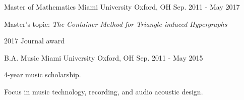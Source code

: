 

\begin{cventries}

  \cventry
    {Master of Mathematics} %
    {Miami University} %
    {Oxford, OH} %
    {Sep. 2011 - May 2017} %
    {
      \begin{cvitems} %
        \item {Master's topic: {\it The Container Method for Triangle-induced Hypergraphs}}
        \item {2017 Journal award}
      \end{cvitems}
    }

  \cventry
    {B.A. Music} %
    {Miami University} %
    {Oxford, OH} %
    {Sep. 2011 - May 2015} %
    {
      \begin{cvitems} %
        \item {4-year music scholarship.}
        \item {Focus in music technology, recording, and audio acoustic design.}
      \end{cvitems}
    }
\end{cventries}
